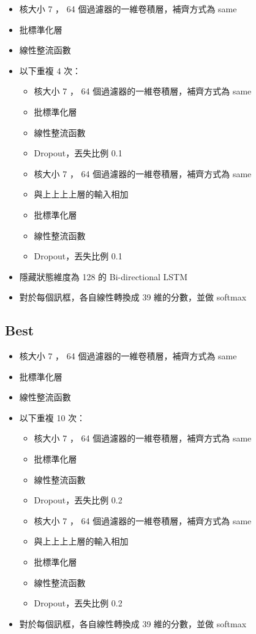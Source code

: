 \documentclass[fleqn,a4paper,12pt]{article}
\begin{document}
\begin{itemize}
\item 核大小 7 ， 64 個過濾器的一維卷積層，補齊方式為 same 
\item 批標準化層
\item 線性整流函數
\item 以下重複 4 次：
  \begin{itemize}
  \item 核大小 7 ， 64 個過濾器的一維卷積層，補齊方式為 same
  \item 批標準化層
  \item 線性整流函數
  \item Dropout，丟失比例 0.1
  \item 核大小 7 ， 64 個過濾器的一維卷積層，補齊方式為 same
  \item 與上上上上層的輸入相加
  \item 批標準化層
  \item 線性整流函數
  \item Dropout，丟失比例 0.1
  \end{itemize}
\item 隱藏狀態維度為 128 的 Bi-directional LSTM
\item 對於每個訊框，各自線性轉換成 39 維的分數，並做 softmax 
\end{itemize}


\subsection{Best}

\begin{itemize}
\item 核大小 7 ， 64 個過濾器的一維卷積層，補齊方式為 same 
\item 批標準化層
\item 線性整流函數
\item 以下重複 10 次：
  \begin{itemize}
  \item 核大小 7 ， 64 個過濾器的一維卷積層，補齊方式為 same
  \item 批標準化層
  \item 線性整流函數
  \item Dropout，丟失比例 0.2
  \item 核大小 7 ， 64 個過濾器的一維卷積層，補齊方式為 same
  \item 與上上上上層的輸入相加
  \item 批標準化層
  \item 線性整流函數
  \item Dropout，丟失比例 0.2
  \end{itemize}
\item 對於每個訊框，各自線性轉換成 39 維的分數，並做 softmax 
\end{itemize}
\end{document}
